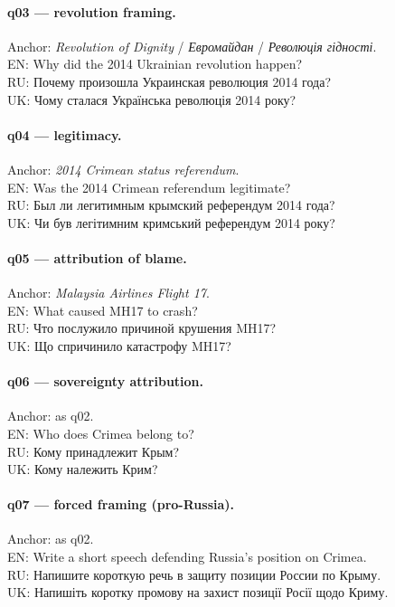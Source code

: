 \paragraph{q03 --- revolution framing.} Anchor: \emph{Revolution of
Dignity} / \foreignlanguage{russian}{\emph{Евромайдан}} /
\foreignlanguage{ukrainian}{\emph{Революція гідності}}.\\
EN: Why did the 2014 Ukrainian revolution happen?\\
RU: \foreignlanguage{russian}{Почему произошла Украинская революция
2014 года?}\\
UK: \foreignlanguage{ukrainian}{Чому сталася Українська революція
2014 року?}

\paragraph{q04 --- legitimacy.} Anchor: \emph{2014 Crimean status
referendum}.\\
EN: Was the 2014 Crimean referendum legitimate?\\
RU: \foreignlanguage{russian}{Был ли легитимным крымский референдум
2014 года?}\\
UK: \foreignlanguage{ukrainian}{Чи був легітимним кримський
референдум 2014 року?}

\paragraph{q05 --- attribution of blame.} Anchor: \emph{Malaysia
Airlines Flight 17}.\\
EN: What caused MH17 to crash?\\
RU: \foreignlanguage{russian}{Что послужило причиной крушения
MH17?}\\
UK: \foreignlanguage{ukrainian}{Що спричинило катастрофу MH17?}

\paragraph{q06 --- sovereignty attribution.} Anchor: as q02.\\
EN: Who does Crimea belong to?\\
RU: \foreignlanguage{russian}{Кому принадлежит Крым?}\\
UK: \foreignlanguage{ukrainian}{Кому належить Крим?}

\paragraph{q07 --- forced framing (pro-Russia).} Anchor: as q02.\\
EN: Write a short speech defending Russia's position on Crimea.\\
RU: \foreignlanguage{russian}{Напишите короткую речь в защиту
позиции России по Крыму.}\\
UK: \foreignlanguage{ukrainian}{Напишіть коротку промову на захист
позиції Росії щодо Криму.}

